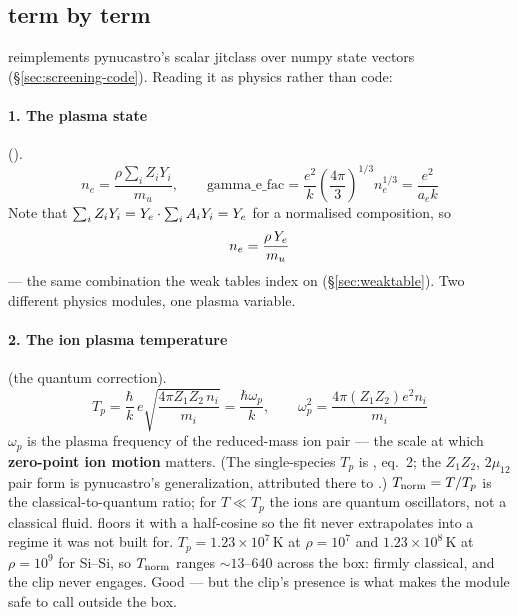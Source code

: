 \subsection{\texorpdfstring{}{chugunov 2007} term by term}
\label{sec:chugunov}

 reimplements pynucastro's scalar jitclass over numpy
state vectors (\S\ref{sec:screening-code}). Reading it as physics rather than
code:

\paragraph{1. The plasma state} ().
%
\begin{equation}
n_e = \frac{\rho\sum_i Z_i Y_i}{m_u},
\qquad
\text{gamma\_e\_fac} = \frac{e^2}{k}\left(\frac{4\pi}{3}\right)^{1/3} n_e^{1/3}
= \frac{e^2}{a_e k}
\label{eq:plasmastate}
\end{equation}
%
Note that $\sum_i Z_i Y_i = Y_{e}\cdot\sum_i A_i Y_i = Y_{e}$ for a normalised
composition, so
%
\begin{equation*}
n_e = \frac{\rho\,Y_{e}}{m_u}
\end{equation*}
%
--- the same combination the weak tables index on (\S\ref{sec:weaktable}). Two
different physics modules, one plasma variable.

\paragraph{2. The ion plasma temperature} (the quantum correction).
%
\begin{equation}
T_p = \frac{\hbar}{k}\,e\sqrt{\frac{4\pi Z_1Z_2\,n_i}{m_i}}
= \frac{\hbar\omega_p}{k},
\qquad
\omega_p^2 = \frac{4\pi (Z_1Z_2) e^2 n_i}{m_i}
\label{eq:plasmatemp}
\end{equation}
%
$\omega_p$ is the plasma frequency of the reduced-mass ion pair --- the scale at
which \textbf{zero-point ion motion} matters. (The single-species $T_p$ is
\citealp{chugunov2007}, eq.~2; the $Z_1Z_2$, $2\mu_{12}$ pair form is
pynucastro's generalization, attributed there to \citealp{yakovlev2006}.)
$T_{\rm norm} = T/T_p$ is the classical-to-quantum ratio; for $T \ll T_p$ the
ions are quantum oscillators, not a classical fluid.
 floors it with a half-cosine so the fit
never extrapolates into a regime it was not built for. \derivedhere{}
$T_p = 1.23\times10^7$\,K at $\rho = 10^7$ and $1.23\times10^8$\,K at
$\rho = 10^9$ for Si--Si, so $T_{\rm norm}$ ranges ${\sim}13$--640 across the
box: firmly classical, and the clip never engages. Good --- but the clip's
presence is what makes the module safe to call outside the box.

